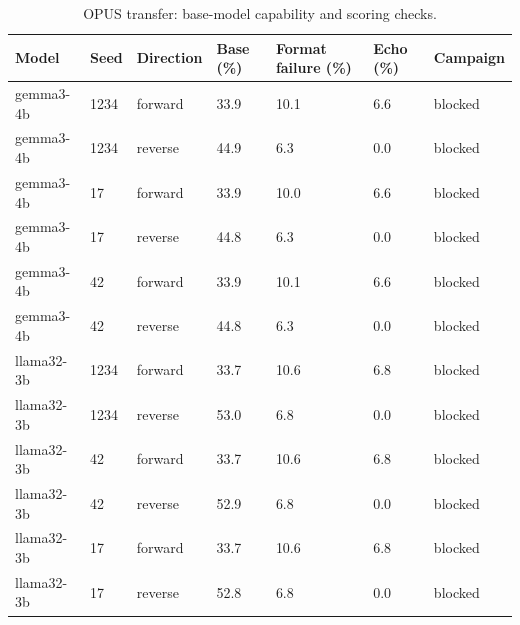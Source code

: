 \begin{table}[t]
\centering\small
\begin{tabular}{lllllll}
\toprule
Model & Seed & Direction & Base (\%) & Format failure (\%) & Echo (\%) & Campaign \\
\midrule
gemma3-4b & 1234 & forward & 33.9 & 10.1 & 6.6 & blocked \\
gemma3-4b & 1234 & reverse & 44.9 & 6.3 & 0.0 & blocked \\
gemma3-4b & 17 & forward & 33.9 & 10.0 & 6.6 & blocked \\
gemma3-4b & 17 & reverse & 44.8 & 6.3 & 0.0 & blocked \\
gemma3-4b & 42 & forward & 33.9 & 10.1 & 6.6 & blocked \\
gemma3-4b & 42 & reverse & 44.8 & 6.3 & 0.0 & blocked \\
llama32-3b & 1234 & forward & 33.7 & 10.6 & 6.8 & blocked \\
llama32-3b & 1234 & reverse & 53.0 & 6.8 & 0.0 & blocked \\
llama32-3b & 42 & forward & 33.7 & 10.6 & 6.8 & blocked \\
llama32-3b & 42 & reverse & 52.9 & 6.8 & 0.0 & blocked \\
llama32-3b & 17 & forward & 33.7 & 10.6 & 6.8 & blocked \\
llama32-3b & 17 & reverse & 52.8 & 6.8 & 0.0 & blocked \\
\bottomrule
\end{tabular}
\caption{OPUS transfer: base-model capability and scoring checks.}
\label{tab:transfer-boundaries}
\end{table}

